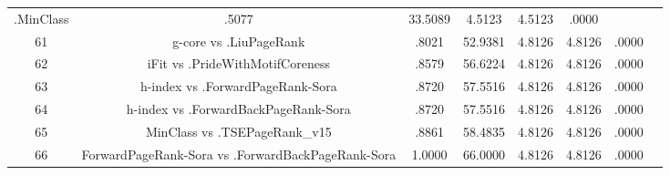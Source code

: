 \documentclass[a4paper,10pt]{article}
\begin{document}
\begin{landscape}
\begin{table}[!htp]
\begin{tabular}{cccccccc}
.MinClass&.5077&33.5089&4.5123&4.5123&.0000\\61&g-core vs .LiuPageRank&.8021&52.9381&4.8126&4.8126&.0000\\62&iFit vs .PrideWithMotifCoreness&.8579&56.6224&4.8126&4.8126&.0000\\63&h-index vs .ForwardPageRank-Sora&.8720&57.5516&4.8126&4.8126&.0000\\64&h-index vs .ForwardBackPageRank-Sora&.8720&57.5516&4.8126&4.8126&.0000\\65&MinClass vs .TSEPageRank_v15&.8861&58.4835&4.8126&4.8126&.0000\\66&ForwardPageRank-Sora vs .ForwardBackPageRank-Sora&1.0000&66.0000&4.8126&4.8126&.0000\\\hline
\end{tabular}
\end{table}

\end{landscape}
\end{document}
